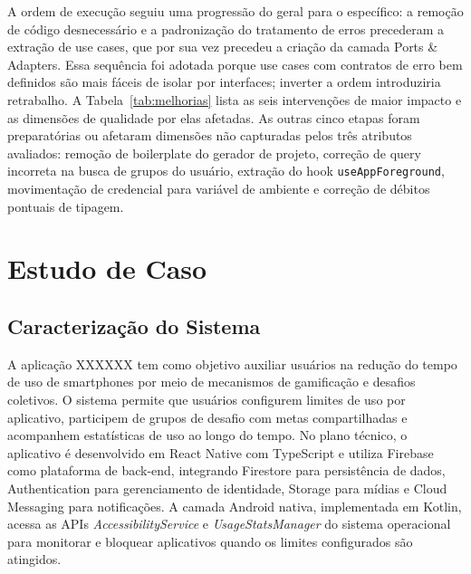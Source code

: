 \documentclass[sigconf,anonymous]{acmart}
\begin{document}
A ordem de execução seguiu uma progressão do geral para o específico: a remoção de código desnecessário e a padronização do tratamento de erros precederam a extração de use cases, que por sua vez precedeu a criação da camada Ports \& Adapters. Essa sequência foi adotada porque use cases com contratos de erro bem definidos são mais fáceis de isolar por interfaces; inverter a ordem introduziria retrabalho. A Tabela~\ref{tab:melhorias} lista as seis intervenções de maior impacto e as dimensões de qualidade por elas afetadas. As outras cinco etapas foram preparatórias ou afetaram dimensões não capturadas pelos três atributos avaliados: remoção de boilerplate do gerador de projeto, correção de query incorreta na busca de grupos do usuário, extração do hook \texttt{useAppForeground}, movimentação de credencial para variável de ambiente e correção de débitos pontuais de tipagem.

\begin{table}[h]
  \caption{Principais intervenções e dimensões de qualidade afetadas}
  \label{tab:melhorias}
\end{table}

\section{Estudo de Caso}

\subsection{Caracterização do Sistema}

A aplicação XXXXXX tem como objetivo auxiliar usuários na redução do tempo de uso de smartphones por meio de mecanismos de gamificação e desafios coletivos. O sistema permite que usuários configurem limites de uso por aplicativo, participem de grupos de desafio com metas compartilhadas e acompanhem estatísticas de uso ao longo do tempo. No plano técnico, o aplicativo é desenvolvido em React Native com TypeScript e utiliza Firebase como plataforma de back-end, integrando Firestore para persistência de dados, Authentication para gerenciamento de identidade, Storage para mídias e Cloud Messaging para notificações. A camada Android nativa, implementada em Kotlin, acessa as APIs \textit{AccessibilityService} e \textit{UsageStatsManager} do sistema operacional para monitorar e bloquear aplicativos quando os limites configurados são atingidos.
\end{document}
